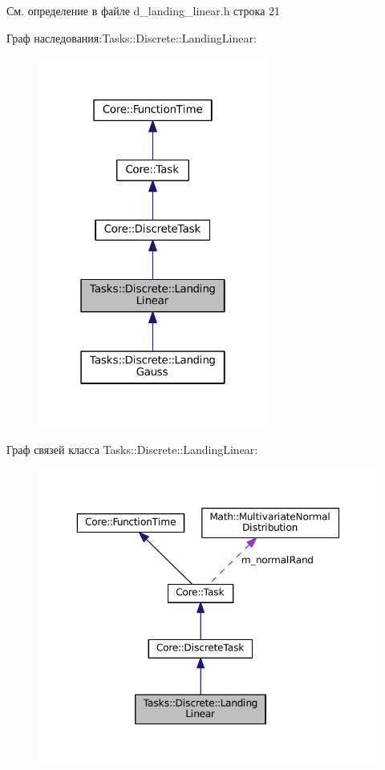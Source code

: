 См. определение в файле d\+\_\+landing\+\_\+linear.\+h строка 21



Граф наследования\+:Tasks\+:\+:Discrete\+:\+:Landing\+Linear\+:
\nopagebreak
\begin{figure}[H]
\begin{center}
\leavevmode
\includegraphics[width=214pt]{class_tasks_1_1_discrete_1_1_landing_linear__inherit__graph}
\end{center}
\end{figure}


Граф связей класса Tasks\+:\+:Discrete\+:\+:Landing\+Linear\+:
\nopagebreak
\begin{figure}[H]
\begin{center}
\leavevmode
\includegraphics[width=350pt]{class_tasks_1_1_discrete_1_1_landing_linear__coll__graph}
\end{center}
\end{figure}


